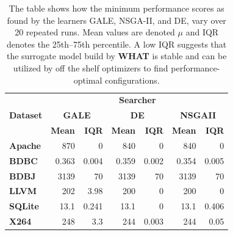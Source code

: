 \documentclass{newsig}
\newcommand{\what}{{\bf WHAT }}
\begin{document}
\begin{table}[tbh]
\caption{The table shows how the minimum performance scores as found by the learners GALE, NSGA-II, and DE, vary over 20 repeated
runs. Mean values are denoted $\mu$ and IQR denotes the 25th--75th percentile. A low IQR suggests that the surrogate model build by \what is stable and can be utilized by off the shelf optimizers to find performance-optimal configurations.
}
\label{fig:external_validity}
\vspace{2ex}
\begin{tabular}{lrrrrrr}
\toprule
\multirow{3}{*}{\textbf{Dataset}} & \multicolumn{6}{c}{\textbf{Searcher}}                                                                       \\ \cmidrule{2-7} 
                                  & \multicolumn{2}{c}{\textbf{GALE}} & \multicolumn{2}{c}{\textbf{DE}} & \multicolumn{2}{c}{\textbf{NSGAII}} \\ \cmidrule{2-7} 
                                  & \textbf{Mean}    & \textbf{IQR}    & \textbf{Mean}   & \textbf{IQR}   & \textbf{Mean}     & \textbf{IQR}     \\ \midrule
\textbf{Apache}                   & 870              & 0               & 840             & 0              & 840               & 0                \\ 
\textbf{BDBC}                     & 0.363            & 0.004           & 0.359           & 0.002          & 0.354             & 0.005            \\ 
\textbf{BDBJ}                     & 3139             & 70              & 3139            & 70             & 3139              & 70               \\ 
\textbf{LLVM}                     & 202              & 3.98            & 200             & 0              & 200               & 0                \\ 
\textbf{SQLite}                   & 13.1             & 0.241           & 13.1            & 0              & 13.1              & 0.406            \\ 
\textbf{X264}                     & 248              & 3.3             & 244             & 0.003          & 244               & 0.05             \\ \bottomrule
\end{tabular}
\end{table}
\end{document}
